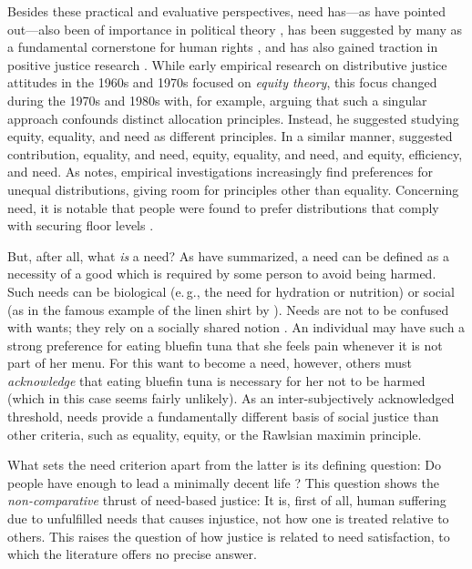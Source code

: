 \documentclass[12pt]{scrartcl}
\begin{document}
Besides these practical and evaluative perspectives, need has---as \cite{bauer_need_2022} have pointed out---also been of importance in political theory \citep{dean_translation_2013,doyal_theory_1984,nussbaum_human_1992,weale_political_1984}, has been suggested by many as a fundamental cornerstone for human rights \citep[e.\,g.,][]{brock_needs_2005,gasper_needs_2005,renzo_human_2015}, and has also gained traction in positive justice research \citep[for summary of some recent work, see, e.\,g.,][]{miller_needs-based_2020}.
While early empirical research on distributive justice attitudes in the 1960s and 1970s focused on \textit{equity theory}, this focus changed during the 1970s and 1980s with, for example, \cite{deutsch_equity_1975} arguing that such a singular approach confounds distinct allocation principles.
Instead, he suggested studying equity, equality, and need as different principles.
In a similar manner, \cite{schwinger_just_1980} suggested contribution, equality, and need, \cite{wagstaff_equity_1994} equity, equality, and need, and \cite{konow_fair_2001} equity, efficiency, and need.
As \cite{konow_is_2009} notes, empirical investigations increasingly find preferences for unequal distributions, giving room for principles other than equality.
Concerning need, it is notable that people were found to prefer distributions that comply with securing floor levels \citep[e.\,g.][]{ahlert_thresholds_2012,frohlich_choosing_1992,frohlich_choices_1987}.

But, after all, what \textit{is} a need?
As \cite{bauer_need_2022} have summarized, a need can be defined as a necessity of a good which is required by some person to avoid being harmed.
Such needs can be biological (e.\,g., the need for hydration or nutrition) or social (as in the famous example of the linen shirt by \citealt{smith_wealth_1979}).
Needs are not to be confused with wants; they rely on a socially shared notion \citep{miller_principles_1999}.
An individual may have such a strong preference for eating bluefin tuna that she feels pain whenever it is not part of her menu.
For this want to become a need, however, others must \textit{acknowledge} that eating bluefin tuna is necessary for her not to be harmed (which in this case seems fairly unlikely).
As an inter-subjectively acknowledged threshold, needs provide a fundamentally different basis of social justice than other criteria, such as equality, equity, or the Rawlsian maximin principle.

What sets the need criterion apart from the latter is its defining question: Do people have enough \citep{frankfurt_inequality_2015} to lead a minimally decent life \citep{miller_principles_1999}?
This question shows the \textit{non-comparative} \citep{feinberg_noncomparative_1974} thrust of need-based justice: It is, first of all, human suffering due to unfulfilled needs that causes injustice, not how one is treated relative to others.
This raises the question of how justice is related to need satisfaction, to which the literature offers no precise answer.
\end{document}
